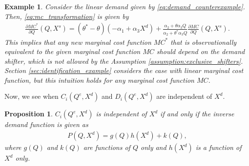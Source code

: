 \documentclass[11pt, a4paper]{article}
\newtheorem{proposition}{Proposition}
\newtheorem{example}{Example}
\theoremstyle{remark}
\begin{document}
\begin{example}\label{example:demand_counterexample}
    Consider the linear demand given by \eqref{eq:demand_counterexample}.
    Then, \eqref{eq:mc_transformation} is given by
    \begin{align}
        \frac{\partial MC^{*}}{\partial Q}(Q, X^{s}) = (\theta^{*} - \theta)(-\alpha_1 + \alpha_3X^{d}) +  \frac{\alpha_2 + \theta\alpha_3Q}{\alpha_2 + \theta^{*}\alpha_3Q}\frac{\partial MC}{\partial Q}(Q, X^{s}).
    \end{align}
    This implies that any new marginal cost function $MC^{*}$ that is observationally equivalent to the given marginal cost function $MC$ should depend on the demand shifter, which is not allowed by the Assumption \ref{assumption:exclusive_shifters}.
    Section \ref{sec:identification_example} considers the case with linear marginal cost function, but this intuition holds for any marginal cost function $MC$.
\end{example}




Now, we see when $C_i(Q^e, X^{d})$ and $D_i(Q^e, X^{d})$ are independent of $X^{d}$.
\begin{proposition}
    $C_i(Q^e, X^{d})$ is independent of $X^{d}$ if and only if the inverse demand function is given as
    \begin{align}
        P(Q, X^{d}) =g(Q)h(X^{d}) + k(Q),
    \end{align}
    where $g(Q)$ and $k(Q)$ are functions of $Q$ only and $h(X^{d})$ is a function of $X^{d}$ only.
\end{proposition}
\end{document}
